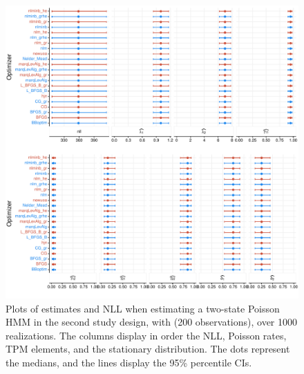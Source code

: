 \documentclass[]{interact}\usepackage[]{graphicx}\usepackage[dvipsnames]{xcolor}
\makeatletter
\def\maxwidth{ %
  \ifdim\Gin@nat@width>\linewidth
    \linewidth
  \else
    \Gin@nat@width
  \fi
}
\newenvironment{knitrout}{}{} %
\theoremstyle{plain}%
\theoremstyle{definition}
\theoremstyle{remark}
\makeatother
\begin{document}
\begin{knitrout}
\color{fgcolor}\begin{figure}[htb]

{\centering \includegraphics[width=\maxwidth]{figure/bootstrap-graph-simu1-1} 

}

\caption[Plots of estimates and NLL when estimating a two-state Poisson HMM in the second study design, with (200 observations), over 1000 realizations]{Plots of estimates and NLL when estimating a two-state Poisson HMM in the second study design, with (200 observations), over 1000 realizations. The columns display in order the NLL, Poisson rates, TPM elements, and the stationary distribution. The dots represent the medians, and the lines display the 95\% percentile CIs.}\label{fig:bootstrap-graph-simu1}
\end{figure}

\end{knitrout}
\end{document}
